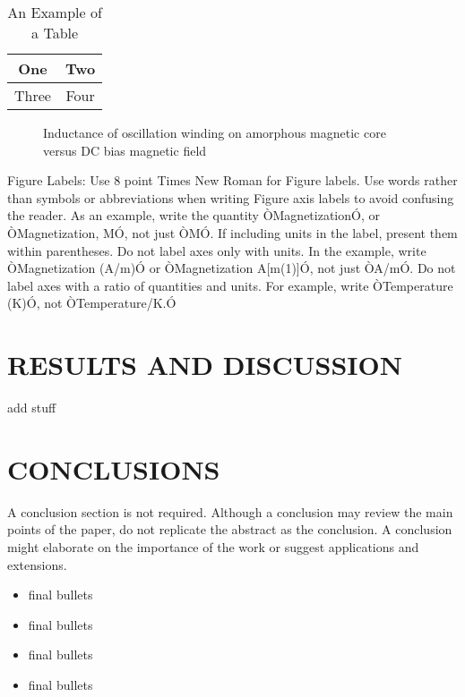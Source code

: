 \documentclass[letterpaper, 10 pt, conference]{ieeeconf}  %
\begin{document}
\begin{table}[h]
\caption{An Example of a Table}
\label{table_example}
\begin{center}
\begin{tabular}{|c||c|}
\hline
One & Two\\
\hline
Three & Four\\
\hline
\end{tabular}
\end{center}
\end{table}


   \begin{figure}[thpb]
      \centering
      \caption{Inductance of oscillation winding on amorphous
       magnetic core versus DC bias magnetic field}
      \label{figurelabel}
   \end{figure}
   

Figure Labels: Use 8 point Times New Roman for Figure labels. Use words rather than symbols or abbreviations when writing Figure axis labels to avoid confusing the reader. As an example, write the quantity ÒMagnetizationÓ, or ÒMagnetization, MÓ, not just ÒMÓ. If including units in the label, present them within parentheses. Do not label axes only with units. In the example, write ÒMagnetization (A/m)Ó or ÒMagnetization {A[m(1)]}Ó, not just ÒA/mÓ. Do not label axes with a ratio of quantities and units. For example, write ÒTemperature (K)Ó, not ÒTemperature/K.Ó


\section{RESULTS AND DISCUSSION}
add stuff

\section{CONCLUSIONS}

A conclusion section is not required. Although a conclusion may review the main points of the paper, do not replicate the abstract as the conclusion. A conclusion might elaborate on the importance of the work or suggest 
applications and extensions. 

\begin{itemize}

\item final bullets 
\item final bullets 
\item final bullets 
\item final bullets 
\end{itemize}
\end{document}

